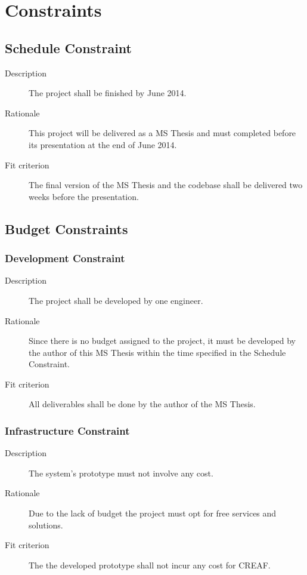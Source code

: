 \section{Constraints} \label{constraints}
\subsection{Schedule Constraint}

\begin{description}
\item[Description] The project shall be finished by June 2014.
\item[Rationale] This project will be delivered as a MS Thesis and must completed before its presentation at the end of June 2014.
\item[Fit criterion] The final version of the MS Thesis and the codebase shall be delivered two weeks before the  presentation.
\end{description}

\subsection{Budget Constraints}

\subsubsection{Development Constraint}

\begin{description}
\item[Description] The project shall be developed by one engineer.
\item[Rationale] Since there is no budget assigned to the project, it must be developed by the author of this MS Thesis within the time specified in the Schedule Constraint.
\item[Fit criterion] All deliverables shall be done by the author of the MS Thesis.
\end{description}

\subsubsection{Infrastructure Constraint}

\begin{description}
\item[Description] The system's prototype must not involve any cost.
\item[Rationale] Due to the lack of budget the project must opt for free services and solutions.
\item[Fit criterion] The the developed prototype shall not incur any cost for CREAF.
\end{description}

